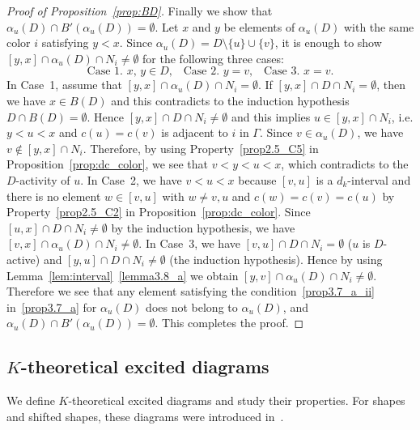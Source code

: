 \documentclass[ALCO,ThmDefs,Unicode,epreuves]{cedram}
\begin{document}
\begin{proof}[Proof of Proposition~\ref{prop:BD}]
Finally we show that $\alpha_u(D) \cap B'(\alpha_u(D)) = \emptyset$.
Let $x$ and $y$ be elements of $\alpha_u(D)$ with the same color $i$ satisfying $y<x$.
Since $\alpha_u(D) = D \setminus \{ u \} \cup \{ v\}$, it is enough to 
show 
$[y,x] \cap \alpha_u(D) \cap N_i \neq \emptyset$
for the following three cases:
$$
\text{Case~1. $x$, $y \in D$,}
\quad
\text{Case~2. $y = v$,}
\quad
\text{Case~3. $x = v$.}
$$
In Case~1, assume that $[y,x] \cap \alpha_u(D) \cap N_i = \emptyset$.
If $[y,x] \cap D \cap N_i = \emptyset$, then we have $x \in B(D)$ 
and this contradicts to the induction hypothesis $D \cap B(D) = \emptyset$.
Hence $[y,x] \cap D \cap N_i \neq \emptyset$ 
and this implies $u \in [y,x] \cap N_i$, 
i.e. $y < u < x$ and $c(u) = c(v)$ is adjacent to $i$ in $\Gamma$.
Since $v \in \alpha_u(D)$, we have $v \not\in [y,x] \cap N_i$.
Therefore, by using Property~\ref{prop2.5_C5} in Proposition~\ref{prop:dc_color}, we see that 
$v < y < u < x$, which contradicts to the $D$-activity of $u$.
In Case~2, we have $v < u < x$ because $[v,u]$ is a $d_k$-interval 
and there is no element $w \in [v,u]$ with $w \neq v, u$ and $c(w) = c(v) = c(u)$ 
by Property~\ref{prop2.5_C2} in Proposition~\ref{prop:dc_color}.
Since $[u,x] \cap D \cap N_i \neq \emptyset$ by the induction hypothesis, 
we have $[v,x] \cap \alpha_u(D) \cap N_i \neq \emptyset$.
In Case~3, we have $[v,u] \cap D \cap N_i = \emptyset$ ($u$ is $D$-active) 
and $[y,u] \cap D \cap N_i \neq \emptyset$ (the induction hypothesis).
Hence by using Lemma~\ref{lem:interval}~\ref{lemma3.8_a} we obtain $[y,v] \cap \alpha_u(D) \cap N_i \neq \emptyset$.
Therefore we see that any element satisfying the condition~\ref{prop3.7_a_ii} in~\ref{prop3.7_a} for $\alpha_u(D)$ 
does not belong to $\alpha_u(D)$, and $\alpha_u(D) \cap B'(\alpha_u(D)) = \emptyset$.
This completes the proof.
\end{proof}

\subsection{%
\texorpdfstring{$K$}{K}-theoretical excited diagrams
}

We define $K$-theoretical excited diagrams and study their properties.
For shapes and shifted shapes, these diagrams were introduced in~\cite{GK}.
\end{document}

